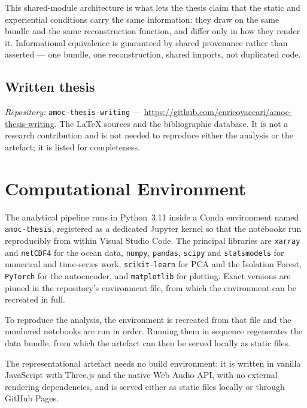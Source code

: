 \noindent This shared-module architecture is what lets the thesis claim that the static and
experiential conditions carry the same information: they draw on the same bundle and the same
reconstruction function, and differ only in how they render it. Informational equivalence is
guaranteed by shared provenance rather than asserted --- one bundle, one reconstruction, shared
imports, not duplicated code.

\subsection*{Written thesis}
\textit{Repository:} \texttt{amoc-thesis-writing} ---
\url{https://github.com/enricovaccari/amoc-thesis-writing}. The \LaTeX{} sources and the
bibliographic database. It is not a research contribution and is not needed to reproduce
either the analysis or the artefact; it is listed for completeness.

\section{Computational Environment}
\label{app:c-environment}

The analytical pipeline runs in Python~3.11 inside a Conda environment named
\texttt{amoc-thesis}, registered as a dedicated Jupyter kernel so that the notebooks run
reproducibly from within Visual Studio Code. The principal libraries are \texttt{xarray} and
\texttt{netCDF4} for the ocean data, \texttt{numpy}, \texttt{pandas}, \texttt{scipy} and
\texttt{statsmodels} for numerical and time-series work, \texttt{scikit-learn} for PCA and the
Isolation Forest, \texttt{PyTorch} for the autoencoder, and \texttt{matplotlib} for plotting.
Exact versions are pinned in the repository's environment file, from which the environment can
be recreated in full.

To reproduce the analysis, the environment is recreated from that file and the numbered
notebooks are run in order. Running them in sequence regenerates the data bundle, from which
the artefact can then be served locally as static files.

The representational artefact needs no build environment: it is written in vanilla JavaScript
with Three.js and the native Web Audio API, with no external rendering dependencies, and is
served either as static files locally or through GitHub Pages.

